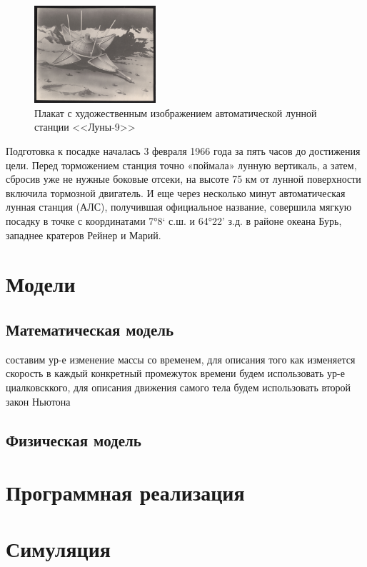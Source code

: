 \begin{figure}
	\centering
	\includegraphics[width=0.4\textwidth]{4164397702}
	\caption{Плакат с художественным изображением автоматической лунной станции <<Луны-9>>}
\end{figure}

\noindent Подготовка к посадке началась 3 февраля 1966 года за пять часов до достижения цели. Перед торможением станция точно «поймала» лунную вертикаль, а затем, сбросив уже не нужные боковые отсеки, на высоте 75 км от лунной поверхности включила тормозной двигатель. И еще через несколько минут автоматическая лунная станция (АЛС), получившая официальное название, совершила мягкую посадку в точке с координатами 7°8‘ с.ш. и 64°22’ з.д. в районе океана Бурь, западнее кратеров Рейнер и Марий.
\\
\section{Модели}
\subsection{Математическая модель}
 составим ур-е изменение массы со временем, для описания того как изменяется скорость в каждый конкретный промежуток времени будем использовать ур-е циалковсккого, для описания движения самого тела будем использовать второй закон Ньютона
\subsection{Физическая модель}

\section{Программная реализация}

\section{Симуляция}

